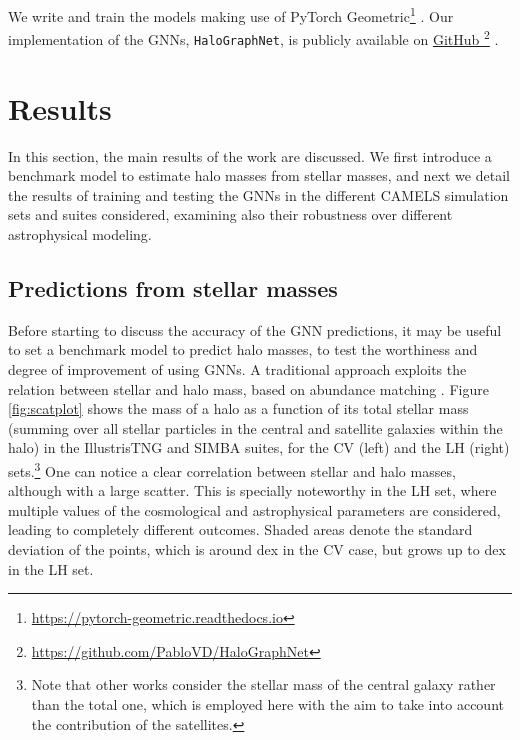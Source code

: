 \documentclass[twocolumn]{aastex631}
\begin{document}
We write and train the models making use of PyTorch Geometric\footnote{\url{https://pytorch-geometric.readthedocs.io}} \citep{Fey_Fast_Graph_Representation_2019}. Our implementation of the GNNs, {\tt HaloGraphNet}, is publicly available on \href{https://github.com/PabloVD/HaloGraphNet}{GitHub }\footnote{\url{https://github.com/PabloVD/HaloGraphNet}} \citep{HaloGraphNet}.



\section{Results}
\label{sec:results}

In this section, the main results of the work are discussed. We first introduce a benchmark model to estimate halo masses from stellar masses, and next we detail the results of training and testing the GNNs in the different CAMELS simulation sets and suites considered, examining also their robustness over different astrophysical modeling.


\subsection{Predictions from stellar masses}
\label{sec:benchmark}



Before starting to discuss the accuracy of the GNN predictions, it may be useful to set a benchmark model to predict halo masses, to test the worthiness and degree of improvement of using GNNs. A traditional approach exploits the relation between stellar and halo mass, based on abundance matching \citep{2010ApJ...717..379B, 2018ARA&A..56..435W}. Figure \ref{fig:scatplot} shows the mass of a halo  as a function of its total stellar mass  (summing over all stellar particles in the central and satellite galaxies within the halo) in the IllustrisTNG and SIMBA suites, for the CV (left) and the LH (right) sets.\footnote{Note that other works consider the stellar mass of the central galaxy rather than the total one, which is employed here with the aim to take into account the contribution of the satellites.} One can notice a clear correlation between stellar and halo masses, although with a large scatter. This is specially noteworthy in the LH set, where multiple values of the cosmological and astrophysical parameters are considered, leading to completely different outcomes. Shaded areas denote the standard deviation of the points, which is around  dex in the CV case, but grows up to  dex in the LH set. 
\end{document}

